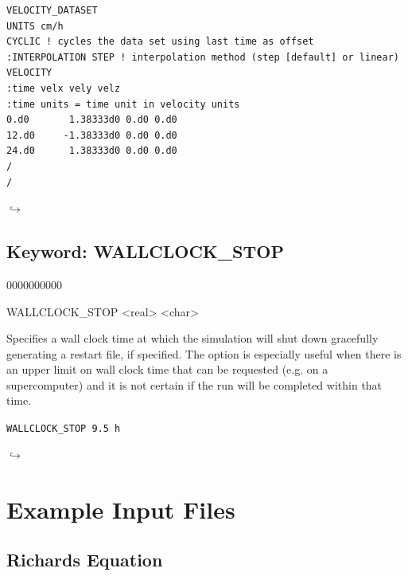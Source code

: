 \documentclass[12pt]{article}
\newcommand\return{{\hfill$\hookrightarrow$}}
\begin{document}

\begin{verbatim}
VELOCITY_DATASET
UNITS cm/h
CYCLIC ! cycles the data set using last time as offset
:INTERPOLATION STEP ! interpolation method (step [default] or linear)
VELOCITY
:time velx vely velz
:time units = time unit in velocity units
0.d0       1.38333d0 0.d0 0.d0 
12.d0     -1.38333d0 0.d0 0.d0 
24.d0      1.38333d0 0.d0 0.d0 
/
/
\end{verbatim}

\hyperlink{target_key}{\return}


\newpage
\protect\hypertarget{target_wallclk}{}

\subsection{Keyword: WALLCLOCK\_STOP}
\begin{deflist}{0000000000}
\item[WALLCLOCK\_STOP] <real> <char>
\end{deflist}

 Specifies a wall clock time at which the simulation will shut down gracefully generating a restart file, if specified. The option is especially useful when there is an upper limit on wall clock time that can be requested (e.g. on a supercomputer) and it is not certain if the run will be completed within that time.

 {\tt WALLCLOCK\_STOP 9.5 h}


\hyperlink{target_key}{\return}

\newpage
\section{Example Input Files}

\subsection{Richards Equation}
\end{document}
